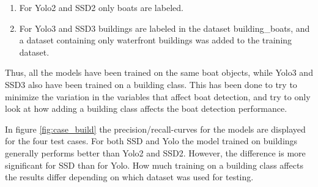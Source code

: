 \vspace{1mm}

\begin{enumerate}
    \item For Yolo2 and SSD2 only boats are labeled.
    \item For Yolo3 and SSD3 buildings are labeled in the dataset building\_boats, and a dataset containing only waterfront buildings was added to the training dataset.
\end{enumerate}

\vspace{1mm}

Thus, all the models have been trained on the same boat objects, while Yolo3 and SSD3 also have been trained on a building class. This has been done to try to minimize the variation in the variables that affect boat detection, and try to only look at how adding a building class affects the boat detection performance.

\vspace{3mm}

In figure \ref{fig:case_build} the precision/recall-curves for the models are displayed for the four test cases. For both SSD and Yolo the model trained on buildings generally performs better than Yolo2 and SSD2. However, the difference is more significant for SSD than for Yolo. How much training on a building class affects the results differ depending on which dataset was used for testing. 

